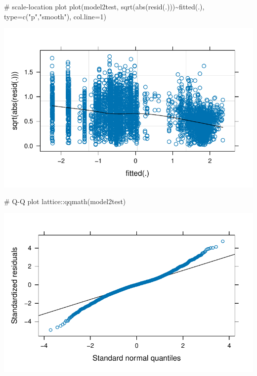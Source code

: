 \documentclass[
  letterpaper,
  DIV=11,
  numbers=noendperiod]{scrreprt}
\newenvironment{Shaded}{\begin{snugshade}}{\end{snugshade}}
\newcommand{\AttributeTok}[1]{\textcolor[rgb]{0.40,0.45,0.13}{#1}}
\newcommand{\CommentTok}[1]{\textcolor[rgb]{0.37,0.37,0.37}{#1}}
\newcommand{\DecValTok}[1]{\textcolor[rgb]{0.68,0.00,0.00}{#1}}
\newcommand{\FunctionTok}[1]{\textcolor[rgb]{0.28,0.35,0.67}{#1}}
\newcommand{\NormalTok}[1]{\textcolor[rgb]{0.00,0.23,0.31}{#1}}
\newcommand{\SpecialCharTok}[1]{\textcolor[rgb]{0.37,0.37,0.37}{#1}}
\newcommand{\StringTok}[1]{\textcolor[rgb]{0.13,0.47,0.30}{#1}}
\begin{document}
\begin{Shaded}
\begin{Highlighting}[]
\CommentTok{\# scale{-}location plot}
\FunctionTok{plot}\NormalTok{(model2test,}
     \FunctionTok{sqrt}\NormalTok{(}\FunctionTok{abs}\NormalTok{(}\FunctionTok{resid}\NormalTok{(.)))}\SpecialCharTok{\textasciitilde{}}\FunctionTok{fitted}\NormalTok{(.),}
     \AttributeTok{type=}\FunctionTok{c}\NormalTok{(}\StringTok{"p"}\NormalTok{,}\StringTok{"smooth"}\NormalTok{), }\AttributeTok{col.line=}\DecValTok{1}\NormalTok{)}
\end{Highlighting}
\end{Shaded}

\includegraphics{G_Ch7_Analysis_files/figure-pdf/lmer-diagnostics-2.pdf}

\begin{Shaded}
\begin{Highlighting}[]
\CommentTok{\# Q{-}Q plot}
\NormalTok{lattice}\SpecialCharTok{::}\FunctionTok{qqmath}\NormalTok{(model2test)}
\end{Highlighting}
\end{Shaded}

\includegraphics{G_Ch7_Analysis_files/figure-pdf/lmer-diagnostics-3.pdf}
\end{document}
